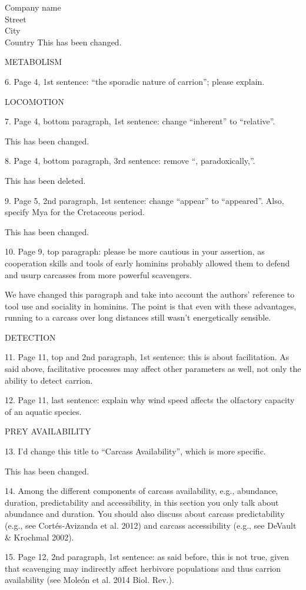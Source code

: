 \documentclass{letter}
\begin{document}
\begin{letter}{Company name \\ Street\\ City\\ Country}
This has been changed. 

METABOLISM

6. Page 4, 1st sentence: “the sporadic nature of carrion”; please explain.

LOCOMOTION

7. Page 4, bottom paragraph, 1st sentence: change “inherent” to “relative”.

This has been changed. 

8. Page 4, bottom paragraph, 3rd sentence: remove “, paradoxically,”.

This has been deleted. 

9. Page 5, 2nd paragraph, 1st sentence: change “appear” to “appeared”. Also, specify Mya for the Cretaceous period.

This has been changed. 

10. Page 9, top paragraph: please be more cautious in your assertion, as cooperation skills and tools of early hominins probably allowed them to defend and usurp carcasses from more powerful scavengers.

We have changed this paragraph and take into account the authors' reference to tool use and sociality in hominins. The point is that even with these advantages, running to a carcass over long distances still wasn't energetically sensible. 

DETECTION

11. Page 11, top and 2nd paragraph, 1st sentence: this is about facilitation. As said above, facilitative processes may affect other parameters as well, not only the ability to detect carrion.

12. Page 11, last sentence: explain why wind speed affects the olfactory capacity of an aquatic species.

PREY AVAILABILITY

13. I’d change this title to “Carcass Availability”, which is more specific.

This has been changed. 

14. Among the different components of carcass availability, e.g., abundance, duration, predictability and accessibility, in this section you only talk about abundance and duration. You should also discuss about carcass predictability (e.g., see Cortés-Avizanda et al. 2012) and carcass accessibility (e.g., see DeVault \& Krochmal 2002).

15. Page 12, 2nd paragraph, 1st sentence: as said before, this is not true, given that scavenging may indirectly affect herbivore populations and thus carrion availability (see Moleón et al. 2014 Biol. Rev.).


\end{letter}
\end{document}
